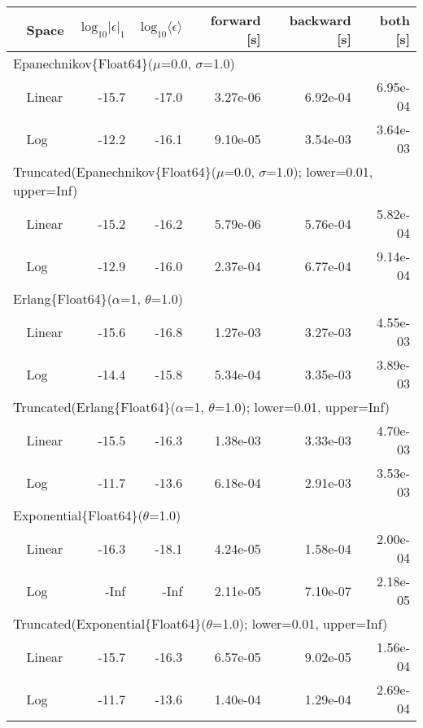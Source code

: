 \begin{tabular}{|llrrrrr|} \hline
& Space & $\mbox{log}_{10}|\epsilon|_1$ & $\mbox{log}_{10}\langle\epsilon\rangle$ & forward [s] & backward [s] & both [s]\\ \hline
\multicolumn{7}{|l|}{Epanechnikov\{Float64\}($\mu$=0.0, $\sigma$=1.0)}\\ \hline
& Linear & {\color{blue}-15.7} & {\color{blue}-17.0} & {\color{blue}3.27e-06} & {\color{blue}6.92e-04} & {\color{blue}6.95e-04}\\
& Log & -12.2 & -16.1 & 9.10e-05 & 3.54e-03 & 3.64e-03\\
\hline
\multicolumn{7}{|l|}{Truncated(Epanechnikov\{Float64\}($\mu$=0.0, $\sigma$=1.0); lower=0.01, upper=Inf)}\\ \hline
& Linear & {\color{blue}-15.2} & {\color{blue}-16.2} & {\color{blue}5.79e-06} & {\color{blue}5.76e-04} & {\color{blue}5.82e-04}\\
& Log & -12.9 & -16.0 & 2.37e-04 & 6.77e-04 & 9.14e-04\\
\hline
\multicolumn{7}{|l|}{Erlang\{Float64\}($\alpha$=1, $\theta$=1.0)}\\ \hline
& Linear & {\color{blue}-15.6} & {\color{blue}-16.8} & 1.27e-03 & {\color{blue}3.27e-03} & 4.55e-03\\
& Log & -14.4 & -15.8 & {\color{blue}5.34e-04} & 3.35e-03 & {\color{blue}3.89e-03}\\
\hline
\multicolumn{7}{|l|}{Truncated(Erlang\{Float64\}($\alpha$=1, $\theta$=1.0); lower=0.01, upper=Inf)}\\ \hline
& Linear & {\color{blue}-15.5} & {\color{blue}-16.3} & 1.38e-03 & 3.33e-03 & 4.70e-03\\
& Log & -11.7 & -13.6 & {\color{blue}6.18e-04} & {\color{blue}2.91e-03} & {\color{blue}3.53e-03}\\
\hline
\multicolumn{7}{|l|}{Exponential\{Float64\}($\theta$=1.0)}\\ \hline
& Linear & -16.3 & -18.1 & 4.24e-05 & 1.58e-04 & 2.00e-04\\
& Log & {\color{blue}-Inf} & {\color{blue}-Inf} & {\color{blue}2.11e-05} & {\color{blue}7.10e-07} & {\color{blue}2.18e-05}\\
\hline
\multicolumn{7}{|l|}{Truncated(Exponential\{Float64\}($\theta$=1.0); lower=0.01, upper=Inf)}\\ \hline
& Linear & {\color{blue}-15.7} & {\color{blue}-16.3} & {\color{blue}6.57e-05} & {\color{blue}9.02e-05} & {\color{blue}1.56e-04}\\
& Log & -11.7 & -13.6 & 1.40e-04 & 1.29e-04 & 2.69e-04\\

\end{tabular}
